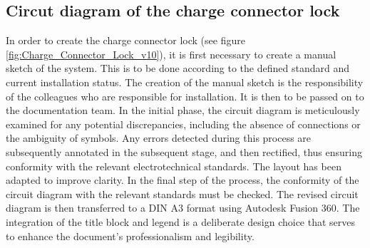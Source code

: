 
\addtocounter{page}{1}

\subsection{Circut diagram of the charge connector lock }

In order to create the charge connector lock (see figure \ref{fig:Charge_Connector_Lock_v10}), it is first necessary to create a manual sketch of the system. This is to be done according to the defined standard and current installation status. The creation of the manual sketch is the responsibility of the colleagues who are responsible for installation. It is then to be passed on to the documentation team. In the initial phase, the circuit diagram is meticulously examined for any potential discrepancies, including the absence of connections or the ambiguity of symbols. Any errors detected during this process are subsequently annotated in the subsequent stage, and then rectified, thus ensuring conformity with the relevant electrotechnical standards. The layout has been adapted to improve clarity. In the final step of the process, the conformity of the circuit diagram with the relevant standards must be checked. The revised circuit diagram is then transferred to a DIN A3 format using Autodesk Fusion 360. The integration of the title block and legend is a deliberate design choice that serves to enhance the document's professionalism and legibility.

\addtocounter{page}{1}

